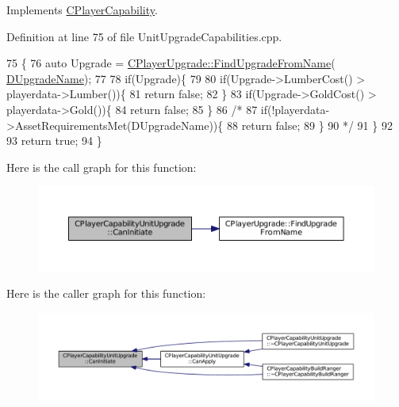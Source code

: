 Implements \hyperlink{classCPlayerCapability_aa83b1e1fcaff2985c378132d679154ea}{C\+Player\+Capability}.



Definition at line 75 of file Unit\+Upgrade\+Capabilities.\+cpp.


\begin{DoxyCode}
75                                                                                                            
                     \{
76     \textcolor{keyword}{auto} Upgrade = \hyperlink{classCPlayerUpgrade_af47a08aba3a1a5b2cefacef24065a82e}{CPlayerUpgrade::FindUpgradeFromName}(
      \hyperlink{classCPlayerCapabilityUnitUpgrade_a5de8bffd6935c699f431329ad4ee5eec}{DUpgradeName});
77     
78     \textcolor{keywordflow}{if}(Upgrade)\{
79 
80         \textcolor{keywordflow}{if}(Upgrade->LumberCost() > playerdata->Lumber())\{
81             \textcolor{keywordflow}{return} \textcolor{keyword}{false};   
82         \}
83         \textcolor{keywordflow}{if}(Upgrade->GoldCost() > playerdata->Gold())\{
84             \textcolor{keywordflow}{return} \textcolor{keyword}{false};   
85         \}
86         \textcolor{comment}{/*}
87 \textcolor{comment}{        if(!playerdata->AssetRequirementsMet(DUpgradeName))\{}
88 \textcolor{comment}{            return false;}
89 \textcolor{comment}{        \}}
90 \textcolor{comment}{        */}
91     \}
92     
93     \textcolor{keywordflow}{return} \textcolor{keyword}{true};
94 \}
\end{DoxyCode}
Here is the call graph for this function\+:\nopagebreak
\begin{figure}[H]
\begin{center}
\leavevmode
\includegraphics[width=350pt]{classCPlayerCapabilityUnitUpgrade_ad01fc5df598efea4063ac2bbf0ba34e9_cgraph}
\end{center}
\end{figure}
Here is the caller graph for this function\+:\nopagebreak
\begin{figure}[H]
\begin{center}
\leavevmode
\includegraphics[width=350pt]{classCPlayerCapabilityUnitUpgrade_ad01fc5df598efea4063ac2bbf0ba34e9_icgraph}
\end{center}
\end{figure}


